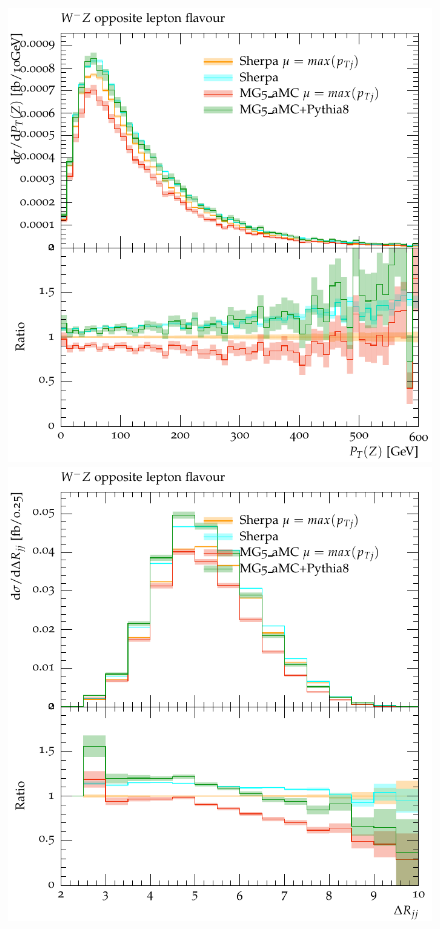\begin{figure}[htbp]
\begin{center}
   \includegraphics[scale=0.65]{figs/dyn_WmZ_OF_ZPt}
   \includegraphics[scale=0.65]{figs/dyn_WmZ_OF_dRjj}

\end{center}
\end{figure}

